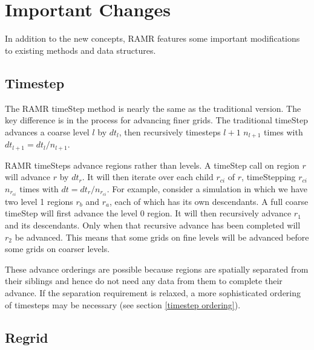 \documentclass[11pt]{article}
\begin{document}
\section{Important Changes}
\label{changes}
In addition to the new concepts, RAMR features some important 
modifications to existing methods and data structures.

\subsection{Timestep}

The RAMR timeStep method is nearly the same as the traditional 
version. The key difference is in the process for advancing finer 
grids. The traditional timeStep advances a coarse level $l$ by 
$dt_l$, then recursively timesteps $l + 1$ $n_{l+1}$ times with 
$dt_{l+1} = dt_l/n_{l+1}$.


RAMR timeSteps advance regions rather than levels. A timeStep call 
on region $r$ will advance $r$ by $dt_r$. It will then iterate over 
each child $r_{ci}$ of $r$, timeStepping $r_{ci}$ $n_{r_{ci}}$ times 
with $dt = dt_r/n_{r_{ci}}$. For example, consider a simulation in 
which we have two level 1 regions $r_b$ and $r_a$, each of which has 
its own descendants. A full coarse timeStep will first advance the 
level 0 region. It will then recursively advance $r_1$ and its 
descendants. Only when that recursive advance has been completed will 
$r_2$ be advanced. This means that some grids on fine levels will be 
advanced before some grids on coarser levels.

These advance orderings are possible because regions are spatially 
separated from their siblings and hence do not need any data from them 
to complete their advance. If the separation requirement is relaxed, a 
more sophisticated ordering of timesteps may be necessary (see section 
\ref{timestep ordering}).

\subsection{Regrid}
\end{document}
